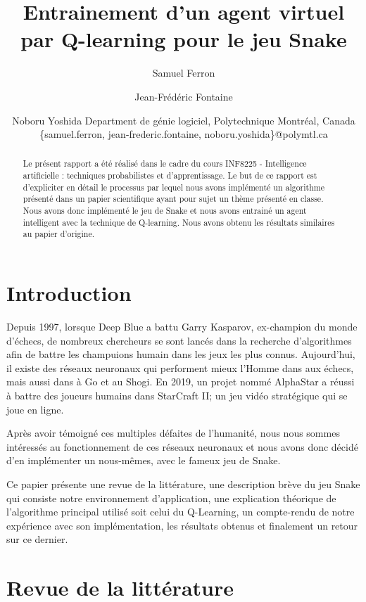 \documentclass{article}
\title{Entrainement d'un agent virtuel par Q-learning pour le jeu Snake}
\author{
Samuel Ferron\and
Jean-Frédéric Fontaine\and
Noboru Yoshida
\affiliations
Department de génie logiciel, Polytechnique Montréal, Canada\\
\emails
\{samuel.ferron, jean-frederic.fontaine, noboru.yoshida\}@polymtl.ca
}
\begin{document}
\maketitle

\begin{abstract}
Le présent rapport a été réalisé dans le cadre du cours INF8225 - Intelligence artificielle : techniques probabilistes et d’apprentissage. Le but de ce rapport est d'expliciter en détail le processus par lequel nous avons implémenté un algorithme présenté dans un papier scientifique ayant pour sujet un thème présenté en classe. Nous avons donc implémenté le jeu de Snake et nous avons entrainé un agent intelligent avec la technique de Q-learning. Nous avons obtenu les résultats similaires au papier d'origine. 
\end{abstract}

\section{Introduction}

Depuis 1997, lorsque Deep Blue a battu Garry Kasparov, ex-champion du monde d’échecs, de nombreux chercheurs se sont lancés dans la recherche d’algorithmes afin de battre les champuions humain dans les jeux les plus connus. Aujourd’hui, il existe des réseaux neuronaux qui performent mieux l'Homme dans aux échecs, mais aussi dans à Go et au Shogi. En 2019, un projet nommé AlphaStar a réussi à battre des joueurs humains dans StarCraft II; un jeu vidéo stratégique qui se joue en ligne.\linebreak

Après avoir témoigné ces multiples défaites de l’humanité, nous nous sommes intéressés au fonctionnement de ces réseaux neuronaux et nous avons donc décidé d’en implémenter un nous-mêmes, avec le fameux jeu de Snake.\linebreak

Ce papier présente une revue de la littérature, une description brève du jeu Snake qui consiste notre environnement d'application, une explication théorique de l'algorithme principal utilisé soit celui du Q-Learning, un compte-rendu de notre expérience avec son implémentation, les résultats obtenus et finalement un retour sur ce dernier.

\section{Revue de la littérature}
 
\end{document}
